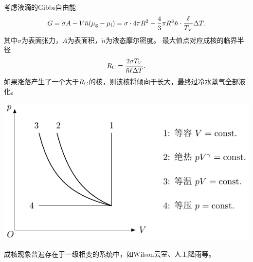 考虑液滴的Gibbs自由能
\begin{equation}
	G=\sigma A-V\tilde n(\mu_{\mathrm{g}}-\mu_{\mathrm{l}})=\sigma\cdot 4\pi R^2-\frac43\pi R^3\tilde n\cdot\frac\ell{T_V}\Delta T.
\end{equation}
其中$\sigma$为表面张力，$A$为表面积，$\tilde n$为液态摩尔密度。
最大值点对应成核的临界半径
\begin{equation}
	R_\mathrm C=\frac{2\sigma T_V}{\tilde n\ell\Delta T}.
\end{equation}
如果涨落产生了一个大于$R_\mathrm C$的核，则该核将倾向于长大，最终过冷水蒸气全部液化。

\begin{center}
	\includegraphics[page=16]{figures/tikz/coordinates.pdf}
	\label{fig:nucleation}
\end{center}

成核现象普遍存在于一级相变的系统中，如Wilson云室、人工降雨等。






